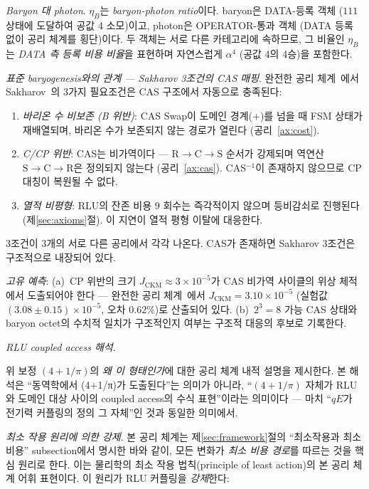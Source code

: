 \documentclass[entropy,article,submit,pdftex,oneauthor]{Definitions/mdpi}
\begin{document}
\emph{Baryon 대 photon}. $\eta_B$는 \emph{baryon-photon ratio}이다. baryon은 DATA-등록 객체 ($111$ 상태에 도달하여 공값 4 소모)이고, photon은 OPERATOR-통과 객체 (DATA 등록 없이 공리 체계를 횡단)이다. 두 객체는 서로 다른 카테고리에 속하므로, 그 비율인 $\eta_B$는 \emph{DATA 측 등록 비용 비율}을 표현하며 자연스럽게 $\alpha^4$ (공값 4의 4승)을 포함한다.

\emph{표준 baryogenesis와의 관계 --- Sakharov 3조건의 CAS 매핑}. 완전한 공리 체계~\cite{han2026}에서 Sakharov~\cite{sakharov1967}의 3가지 필요조건은 CAS 구조에서 자동으로 충족된다:
\begin{enumerate}
\item \emph{바리온 수 비보존 (B 위반)}: CAS Swap이 도메인 경계(+)를 넘을 때 FSM 상태가 재배열되며, 바리온 수가 보존되지 않는 경로가 열린다 (공리~\ref{ax:cost}).
\item \emph{C/CP 위반}: CAS는 비가역이다 --- $\mathrm{R} \to \mathrm{C} \to \mathrm{S}$ 순서가 강제되며 역연산 $\mathrm{S} \to \mathrm{C} \to \mathrm{R}$은 정의되지 않는다 (공리~\ref{ax:cas}). CAS$^{-1}$이 존재하지 않으므로 CP 대칭이 복원될 수 없다.
\item \emph{열적 비평형}: RLU의 잔존 비용 $9$ 회수는 즉각적이지 않으며 등비감쇠로 진행된다 (제\ref{sec:axioms}절). 이 지연이 열적 평형 이탈에 대응한다.
\end{enumerate}
3조건이 3개의 서로 다른 공리에서 각각 나온다. CAS가 존재하면 Sakharov 3조건은 구조적으로 내장되어 있다.

\emph{고유 예측}: (a)~CP 위반의 크기 $J_\text{CKM} \approx 3 \times 10^{-5}$가 CAS 비가역 사이클의 위상 체적에서 도출되어야 한다 --- 완전한 공리 체계~\cite{han2026}에서 $J_\text{CKM} = 3.10 \times 10^{-5}$ (실험값 $(3.08 \pm 0.15) \times 10^{-5}$, 오차 $0.62\%$)로 산출되어 있다. (b)~$2^3 = 8$ 가능 CAS 상태와 baryon octet의 수치적 일치가 구조적인지 여부는 구조적 대응의 후보로 기록한다.

\emph{RLU coupled access 해석}.

위 보정 $(4 + 1/\pi)$의 \emph{왜 이 형태인가}에 대한 공리 체계 내적 설명을 제시한다. 본 해석은 ``동역학에서 (4+1/π)가 도출된다''는 의미가 아니라, ``$(4 + 1/\pi)$ 자체가 RLU와 도메인 대상 사이의 coupled access의 수식 표현''이라는 의미이다 — 마치 ``$qE$가 전기력 커플링의 정의 그 자체''인 것과 동일한 의미에서.

\emph{최소 작용 원리에 의한 강제}. 본 공리 체계는 제\ref{sec:framework}절의 ``최소작용과 최소비용'' subsection에서 명시한 바와 같이, 모든 변화가 \emph{최소 비용 경로}를 따르는 것을 핵심 원리로 한다. 이는 물리학의 최소 작용 법칙(principle of least action)의 본 공리 체계 어휘 표현이다. 이 원리가 RLU 커플링을 \emph{강제}한다:
\end{document}
